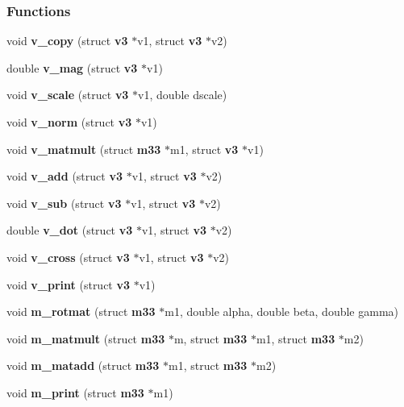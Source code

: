 \subsubsection*{Functions}
\begin{CompactItemize}
\item 
void {\bf v\_\-copy} (struct {\bf v3} $\ast$v1, struct {\bf v3} $\ast$v2)
\item 
double {\bf v\_\-mag} (struct {\bf v3} $\ast$v1)
\item 
void {\bf v\_\-scale} (struct {\bf v3} $\ast$v1, double dscale)
\item 
void {\bf v\_\-norm} (struct {\bf v3} $\ast$v1)
\item 
void {\bf v\_\-matmult} (struct {\bf m33} $\ast$m1, struct {\bf v3} $\ast$v1)
\item 
void {\bf v\_\-add} (struct {\bf v3} $\ast$v1, struct {\bf v3} $\ast$v2)
\item 
void {\bf v\_\-sub} (struct {\bf v3} $\ast$v1, struct {\bf v3} $\ast$v2)
\item 
double {\bf v\_\-dot} (struct {\bf v3} $\ast$v1, struct {\bf v3} $\ast$v2)
\item 
void {\bf v\_\-cross} (struct {\bf v3} $\ast$v1, struct {\bf v3} $\ast$v2)
\item 
void {\bf v\_\-print} (struct {\bf v3} $\ast$v1)
\item 
void {\bf m\_\-rotmat} (struct {\bf m33} $\ast$m1, double alpha, double beta, double gamma)
\item 
void {\bf m\_\-matmult} (struct {\bf m33} $\ast$m, struct {\bf m33} $\ast$m1, struct {\bf m33} $\ast$m2)
\item 
void {\bf m\_\-matadd} (struct {\bf m33} $\ast$m1, struct {\bf m33} $\ast$m2)
\item 
void {\bf m\_\-print} (struct {\bf m33} $\ast$m1)
\end{CompactItemize}
